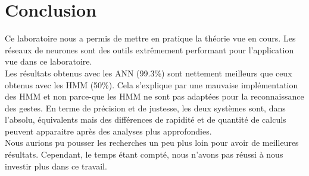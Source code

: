 
\chapter{Conclusion} %

\label{Conclusion} %



Ce laboratoire nous a permis de mettre en pratique la théorie vue en cours. Les réseaux de neurones sont des outils extrêmement performant pour l'application vue dans ce laboratoire. \\

Les résultats obtenus avec les ANN (99.3\%) sont nettement meilleurs que ceux obtenus avec les HMM (50\%). Cela s'explique par une mauvaise implémentation des HMM et non parce-que les HMM ne sont pas adaptées pour la reconnaissance des gestes.
En terme de précision et de justesse, les deux systèmes sont, dans l'absolu, équivalents mais des différences de rapidité et de quantité de calculs peuvent apparaitre après des analyses plus approfondies.\\

Nous aurions pu pousser les recherches un peu plus loin pour avoir de meilleures résultats. Cependant, le temps étant compté, nous n'avons pas réussi à nous investir plus dans ce travail.